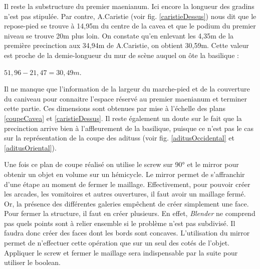 Il reste la substructure du premier \gls{maenianum}. Ici encore la longueur des gradins n'est pas stipulée. Par contre, A.Caristie (voir fig. \ref{caristieDessus}) nous dit que le repose-pied se trouve à 14,95m du centre de la \gls{cavea} et que le \gls{podium} du premier niveau se trouve 20m plus loin. On constate qu'en enlevant les 4,35m de la première \gls{precinction} aux 34,94m de A.Caristie, on obtient 30,59m. Cette valeur est proche de la demie-longueur du mur de scène auquel on ôte la basilique : 
\begin{center}
$51,96 - 21,47=30,49m$.
\end{center}

Il ne manque que l'information de la largeur du marche-pied et de la couverture du caniveau pour connaitre l'espace réservé au premier \gls{maenianum} et terminer cette partie. Ces dimensions sont obtenues par mise à l'échelle des plans \ref{coupeCavea} et \ref{caristieDessus}. Il reste également un doute sur le fait que la \gls{precinction} arrive bien à l'affleurement de la basilique, puisque ce n'est pas le cas sur la représentation de la coupe des \glspl{aditus} (voir fig. \ref{aditusOccidental} et \ref{aditusOriental}).

Une fois ce plan de coupe réalisé on utilise le \gls{screw} sur 90° et le \gls{mirror} pour obtenir un objet en volume sur un hémicycle. Le \gls{mirror} permet de s'affranchir d'une étape au moment de fermer le maillage. Effectivement, pour pouvoir créer les arcades, les vomitoires et autres ouvertures, il faut avoir un maillage fermé. Or, la présence des différentes galeries empêchent de créer simplement une face. Pour fermer la structure, il faut en créer plusieurs. En effet, \textit{Blender} ne comprend pas quels points sont à relier ensemble si le problème n'est pas subdivisé. Il faudra donc créer des faces dont les bords sont concaves. L'utilisation du \gls{mirror} permet de n'effectuer cette opération que sur un seul des cotés de l'objet. Appliquer le \gls{screw} et fermer le maillage sera indispensable par la suite pour utiliser le \gls{boolean}.

